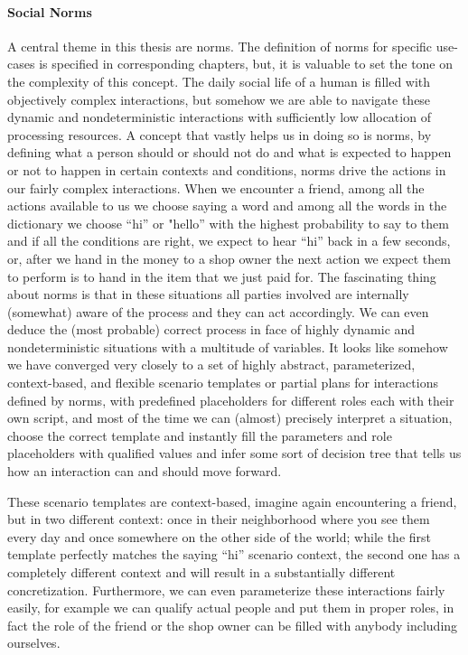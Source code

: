 \paragraph{Social Norms}
A central theme in this thesis are norms. The definition of norms for specific use-cases is specified in corresponding chapters, but, it is valuable to set the tone on the complexity of this concept. The daily social life of a human is filled with objectively complex interactions, but somehow we are able to navigate these dynamic and nondeterministic interactions with sufficiently low allocation of processing resources. A concept that vastly helps us in doing so is norms, by defining what a person should or should not do and what is expected to happen or not to happen in certain contexts and conditions, norms drive the actions in our fairly complex interactions. When we encounter a friend, among all the actions available to us we choose saying a word and among all the words in the dictionary we choose ``hi'' or "hello'' with the highest probability to say to them and if all the conditions are right, we expect to hear ``hi'' back in a few seconds, or, after we hand in the money to a shop owner the next action we expect them to perform is to hand in the item that we just paid for. The fascinating thing about norms is that in these situations all parties involved are internally (somewhat) aware of the process and they can act accordingly. We can even deduce the (most probable) correct process in face of highly dynamic and nondeterministic situations with a multitude of variables. It looks like somehow we have converged very closely to a set of highly abstract, parameterized, context-based, and flexible scenario templates or partial plans for interactions defined by norms, with predefined placeholders for different roles each with their own script, and most of the time we can (almost) precisely interpret a situation, choose the correct template and instantly fill the parameters and role placeholders with qualified values and infer some sort of decision tree that tells us how an interaction can and should move forward.


These scenario templates are context-based, imagine again encountering a friend, but in two different context: once in their neighborhood where you see them every day and once somewhere on the other side of the world; while the first template perfectly matches the saying ``hi'' scenario context, the second one has a completely different context and will result in a substantially different concretization. Furthermore, we can even parameterize these interactions fairly easily, for example we can qualify actual people and put them in proper roles, in fact the role of the friend or the shop owner can be filled with anybody including ourselves.


